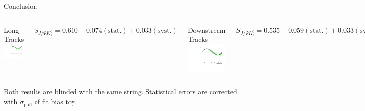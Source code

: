 \documentclass{beamer}
\newcommand{\SJPsi}{S_{J/\Psi K_s^0}}
\begin{document}
\begin{frame}{Conclusion}
	\begin{columns}
	\begin{block}{Long Tracks}
	\centering
	\includegraphics[width=\textwidth]{asymmetry_lt}	
	\end{block}
	$\SJPsi = 0.610 \pm 0.074 (\text{stat.}) \pm 0.033 (\text{syst.})$
	\begin{block}{Downstream Tracks}
	\centering
	\includegraphics[width=\textwidth]{asymmetry_ds}
	\end{block}
	$\SJPsi = 0.535 \pm 0.059 (\text{stat.}) \pm 0.033 (\text{syst.})$
	\end{columns}
    \begin{center}
    Both results are blinded with the same string. Statistical errors are corrected with $\sigma_{\text{pull}}$ of fit bias toy.
    \end{center}
\end{frame}
\end{document}
